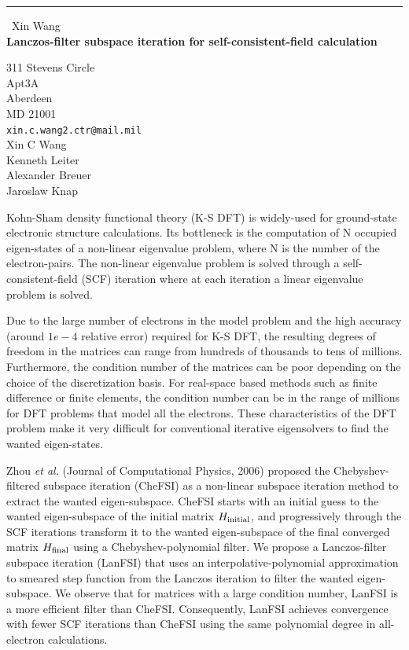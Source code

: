 \documentclass{report}
\begin{document}
\begin{center}
\rule{6in}{1pt} \
{\large Xin Wang \\
{\bf Lanczos-filter subspace iteration for self-consistent-field calculation}}

311 Stevens Circle \\ Apt3A \\ Aberdeen \\ MD 21001
\\
{\tt xin.c.wang2.ctr@mail.mil}\\
Xin C Wang\\
Kenneth Leiter\\
Alexander Breuer\\
Jaroslaw Knap\end{center}

Kohn-Sham density functional theory (K-S DFT) is widely-used for
ground-state electronic structure calculations. Its bottleneck is the
computation of N occupied eigen-states of a non-linear eigenvalue problem, where
N is the number of the electron-pairs. The non-linear eigenvalue problem is
solved through a self-consistent-field (SCF) iteration where at each iteration
a linear eigenvalue problem is solved.

Due to the large number of electrons in
the model problem and the high accuracy (around $1e-4$ relative error) required
for K-S DFT, the resulting degrees of freedom in the matrices can range from
hundreds of thousands to tens of millions. Furthermore, the condition number
of the matrices can be poor depending on the choice of the discretization
basis. For real-space
based methods such as finite difference or finite elements, the condition number
can be in the range of millions for DFT problems that
model all the electrons. These characteristics of the DFT problem make it very
difficult for conventional iterative eigensolvers to find the wanted eigen-states.

Zhou \emph{et al.} (Journal of Computational Physics,
2006) proposed the Chebyshev-filtered subspace iteration (CheFSI) as a
non-linear subspace iteration method to extract the wanted eigen-subspace.
CheFSI starts with an initial guess to the wanted eigen-subspace of the initial
matrix $H_{\rm initial}$, and progressively through the SCF iterations
transform it to the wanted eigen-subspace of the final converged matrix
$H_{\rm final}$ using a
Chebyshev-polynomial filter. We propose a Lanczos-filter subspace
iteration (LanFSI) that uses an interpolative-polynomial approximation to
smeared step function from the Lanczos iteration to filter the wanted
eigen-subspace. We observe that for matrices with
a large condition number, LanFSI is a more efficient filter than CheFSI.
Consequently, LanFSI achieves convergence with fewer SCF iterations than
CheFSI using the same polynomial degree in all-electron calculations.
\end{document}
